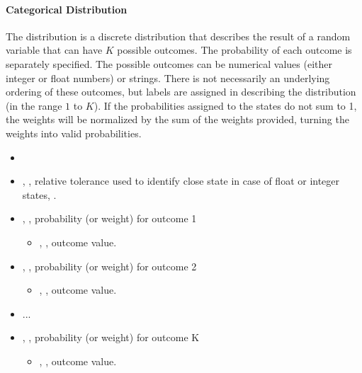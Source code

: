 \paragraph{Categorical Distribution}
\label{Categorical}
The  distribution is a discrete distribution that describes the result of a random variable that can have $K$ possible outcomes.
The probability of each outcome is separately specified.
The possible outcomes can be  numerical values (either integer or float numbers) or strings.
%
There is not necessarily an underlying ordering of these outcomes, but labels are assigned in describing the distribution (in the range $1$ to $K$).
If the probabilities assigned to the states do not sum to 1, the weights will be normalized by the sum of the weights provided,
turning the weights into valid probabilities.
%
%
\attrIntro
\vspace{-5mm}
\begin{itemize}
  \itemsep0em
  \item \nameDescription
\end{itemize}
\vspace{-5mm}
\subnodeIntro
\begin{itemize}
  \item {}, , relative tolerance used to identify close state in case of float or integer states,  .
  \item {}, , probability (or weight) for outcome 1
  \begin{itemize}
          \item {}, , outcome value.
  \end{itemize}
  \item {}, , probability (or weight) for outcome 2
  \begin{itemize}
          \item {}, , outcome value.
  \end{itemize}
  \item ...
  \item {}, , probability (or weight) for outcome K
  \begin{itemize}
          \item {}, , outcome value.
  \end{itemize}
 \end{itemize}
